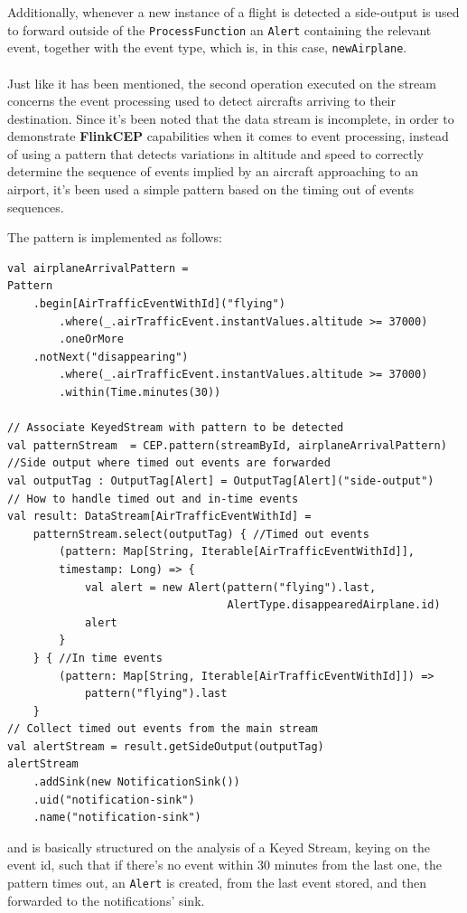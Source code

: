 Additionally, whenever a new instance of a flight is detected a side-output is used to forward outside of the \texttt{ProcessFunction} an \texttt{Alert} containing the relevant event, together with the event type, which is, in this case, \texttt{newAirplane}.
\\\\
Just like it has been mentioned, the second operation executed on the stream concerns the event processing used to detect aircrafts arriving to their destination. Since it's been noted that the data stream is incomplete, in order to demonstrate \textbf{FlinkCEP} capabilities when it comes to event processing, instead of using a pattern that detects variations in altitude and speed to correctly determine the sequence of events implied by an aircraft approaching to an airport, it's been used a simple pattern based on the timing out of events sequences.

The pattern is implemented as follows:

\begin{verbatim}
val airplaneArrivalPattern = 
Pattern
    .begin[AirTrafficEventWithId]("flying")
        .where(_.airTrafficEvent.instantValues.altitude >= 37000)
        .oneOrMore
    .notNext("disappearing")
        .where(_.airTrafficEvent.instantValues.altitude >= 37000)
        .within(Time.minutes(30))

// Associate KeyedStream with pattern to be detected
val patternStream  = CEP.pattern(streamById, airplaneArrivalPattern)
//Side output where timed out events are forwarded
val outputTag : OutputTag[Alert] = OutputTag[Alert]("side-output")
// How to handle timed out and in-time events
val result: DataStream[AirTrafficEventWithId] = 
    patternStream.select(outputTag) { //Timed out events
        (pattern: Map[String, Iterable[AirTrafficEventWithId]], 
        timestamp: Long) => {
            val alert = new Alert(pattern("flying").last, 
                                  AlertType.disappearedAirplane.id)
            alert
        }
    } { //In time events
        (pattern: Map[String, Iterable[AirTrafficEventWithId]]) =>
            pattern("flying").last
    }   
// Collect timed out events from the main stream
val alertStream = result.getSideOutput(outputTag)
alertStream
    .addSink(new NotificationSink())
    .uid("notification-sink")
    .name("notification-sink")
\end{verbatim}

and is basically structured on the analysis of a Keyed Stream, keying on the event id, such that if there's no event within 30 minutes from the last one, the pattern times out, an \texttt{Alert} is created, from the last event stored, and then forwarded to the notifications' sink.

